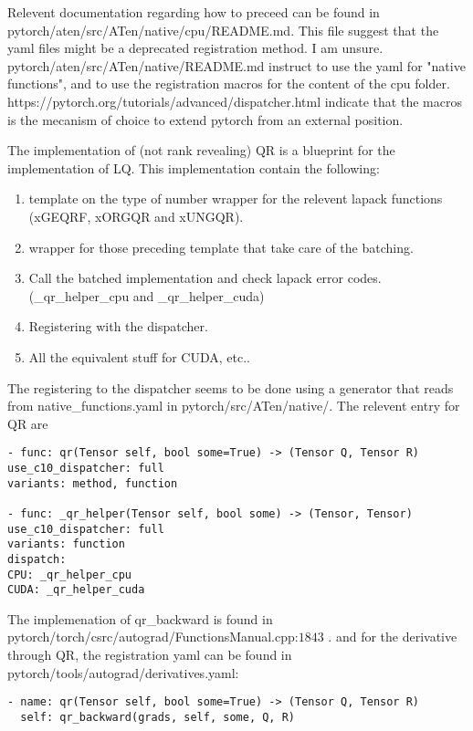 \documentclass[15pt]{report}
\begin{document}
Relevent documentation regarding how to preceed can be found in\\
pytorch/aten/src/ATen/native/cpu/README.md.
This file suggest that the yaml files might be a deprecated registration method. I am unsure.\\
pytorch/aten/src/ATen/native/README.md instruct to use the yaml for "native functions", and to use the registration macros for the content of the cpu folder.\\
https://pytorch.org/tutorials/advanced/dispatcher.html indicate that the macros is the mecanism of choice to extend pytorch from an external position.

The implementation of (not rank revealing) QR is a blueprint for the implementation of LQ.
This implementation contain the following:

\begin{enumerate}
    \item template on the type of number wrapper for the relevent lapack functions (xGEQRF, xORGQR and xUNGQR).
    \item wrapper for those preceding template that take care of the batching.
    \item Call the batched implementation and check lapack error codes. (\_qr\_helper\_cpu and \_qr\_helper\_cuda)
    \item Registering with the dispatcher.
    \item All the equivalent stuff for CUDA, etc..
\end{enumerate}
The registering to the dispatcher seems to be done using a generator that reads from native\_functions.yaml in pytorch/src/ATen/native/.
The relevent entry for QR are
\begin{verbatim}
- func: qr(Tensor self, bool some=True) -> (Tensor Q, Tensor R)
use_c10_dispatcher: full
variants: method, function

- func: _qr_helper(Tensor self, bool some) -> (Tensor, Tensor)
use_c10_dispatcher: full
variants: function
dispatch:
CPU: _qr_helper_cpu
CUDA: _qr_helper_cuda
\end{verbatim}

The implemenation of qr\_backward is found in\\ pytorch/torch/csrc/autograd/FunctionsManual.cpp:$1843$ .
and for the derivative through QR, the registration yaml can be found in \\
pytorch/tools/autograd/derivatives.yaml:
\begin{verbatim}
- name: qr(Tensor self, bool some=True) -> (Tensor Q, Tensor R)
  self: qr_backward(grads, self, some, Q, R)
\end{verbatim}
\end{document}
